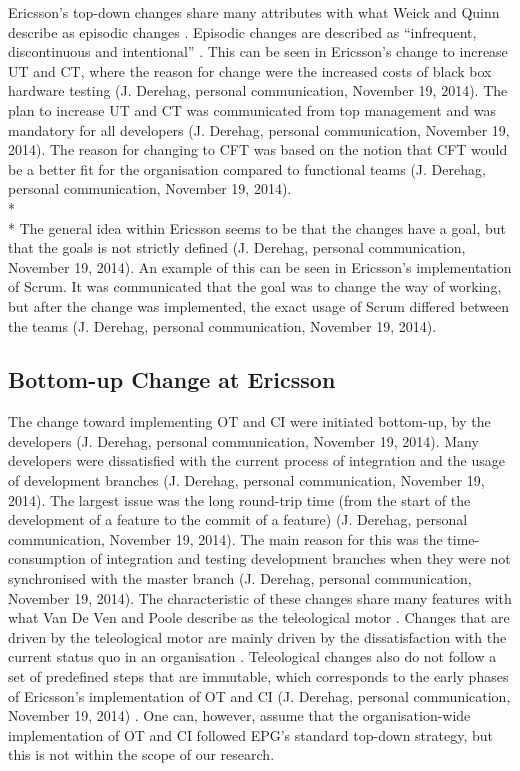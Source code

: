 \documentclass[final_report_innit.tex]{subfiles}
\begin{document}
Ericsson’s top-down changes share many attributes with what Weick and Quinn describe as episodic changes \cite{weick1999organizational}. Episodic changes are described as “infrequent, discontinuous and intentional” \cite{weick1999organizational}. This can be seen in Ericsson’s change to increase UT and CT, where the reason for change were the increased costs of black box hardware testing (J. Derehag, personal communication, November 19, 2014). The plan to increase UT and CT was communicated from top management and was mandatory for all developers (J. Derehag, personal communication, November 19, 2014). The reason for changing to CFT was based on the notion that CFT would be a better fit for the organisation compared to functional teams (J. Derehag, personal communication, November 19, 2014). 
\\* 
\\* 
The general idea within Ericsson seems to be that the changes have a goal, but that the goals is not strictly defined (J. Derehag, personal communication, November 19, 2014). An example of this can be seen in Ericsson’s implementation of Scrum. It was communicated that the goal was to change the way of working, but after the change was implemented, the exact usage of Scrum differed between the teams (J. Derehag, personal communication, November 19, 2014). 

\subsection{Bottom-up Change at Ericsson}
The change toward implementing OT and CI were initiated bottom-up, by the developers (J. Derehag, personal communication, November 19, 2014). Many developers were dissatisfied with the current process of integration and the usage of development branches (J. Derehag, personal communication, November 19, 2014). The largest issue was the long round-trip time (from the start of the development of a feature to the commit of a feature) (J. Derehag, personal communication, November 19, 2014). The main reason for this was the time-consumption of integration and testing development branches when they were not synchronised with the master branch (J. Derehag, personal communication, November 19, 2014). The characteristic of these changes share many features with what Van De Ven and Poole describe as the teleological motor \cite{van1995explaining}. Changes that are driven by the teleological motor are mainly driven by the dissatisfaction with the current status quo in an organisation \cite{van1995explaining}. Teleological changes also do not follow a set of predefined steps that are immutable, which corresponds to the early phases of Ericsson’s implementation of OT and CI (J. Derehag, personal communication, November 19, 2014) \cite{van1995explaining}. One can, however, assume that the organisation-wide implementation of OT and CI followed EPG’s standard top-down strategy, but this is not within the scope of our research.
\end{document}
